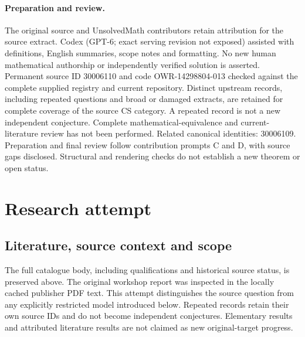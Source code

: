 \documentclass[11pt]{article}
\begin{document}
\paragraph{Preparation and review.}
The original source and UnsolvedMath contributors retain attribution for the source extract. Codex (GPT-6; exact serving revision not exposed) assisted with definitions, English summaries, scope notes and formatting. No new human mathematical authorship or independently verified solution is asserted. Permanent source ID 30006110 and code OWR-14298804-013 checked against the complete supplied registry and current repository. Distinct upstream records, including repeated questions and broad or damaged extracts, are retained for complete coverage of the source CS category. A repeated record is not a new independent conjecture. Complete mathematical-equivalence and current-literature review has not been performed. Related canonical identities: 30006109. Preparation and final review follow contribution prompts C and D, with source gaps disclosed. Structural and rendering checks do not establish a new theorem or open status.
\label{end:30006110}

\section{Research attempt}
\subsection{Literature, source context and scope}
The full catalogue body, including qualifications and historical source status, is preserved above. The original workshop report was inspected in the locally cached publisher PDF text. This attempt distinguishes the source question from any explicitly restricted model introduced below. Repeated records retain their own source IDs and do not become independent conjectures. Elementary results and attributed literature results are not claimed as new original-target progress.
\end{document}
